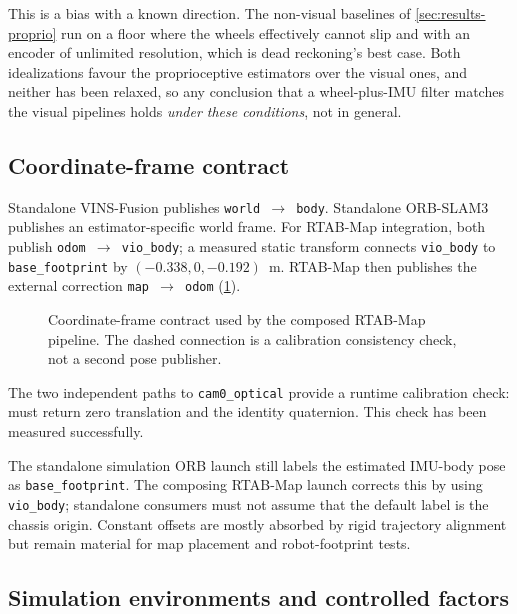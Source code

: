 \begin{queried}
This is a bias with a known direction. The non-visual baselines of
\cref{sec:results-proprio} run on a floor where the wheels effectively cannot
slip and with an encoder of unlimited resolution, which is dead reckoning's
best case. Both idealizations favour the proprioceptive estimators over the
visual ones, and neither has been relaxed, so any conclusion that a
wheel-plus-IMU filter matches the visual pipelines holds \emph{under these
conditions}, not in general.
\end{queried}

\subsection{Coordinate-frame contract}
\label{sec:frames-contract}
Standalone VINS-Fusion publishes \texttt{world~$\rightarrow$~body}. Standalone
ORB-SLAM3 publishes an estimator-specific world frame. For RTAB-Map integration,
both publish \texttt{odom~$\rightarrow$~vio\_body}; a measured static transform
connects \texttt{vio\_body} to \texttt{base\_footprint} by
$(-0.338,0,-0.192)$~m. RTAB-Map then publishes the external correction
\texttt{map~$\rightarrow$~odom} (\cref{fig:frame-chain}).

\begin{figure}[htbp]
  \centering
  \resizebox{\textwidth}{!}{}
  \caption[Coordinate-frame contract used by the composed RTAB-Map pipeline.]{Coordinate-frame contract used by the composed RTAB-Map pipeline. The
  dashed connection is a calibration consistency check, not a second pose
  publisher.}
  \label{fig:frame-chain}
\end{figure}

The two independent paths to \texttt{cam0\_optical} provide a runtime calibration
check:  must return zero translation and
the identity quaternion. This check has been measured successfully.

The standalone simulation ORB launch still labels the estimated IMU-body pose as
\texttt{base\_footprint}. The composing RTAB-Map launch corrects this by using
\texttt{vio\_body}; standalone consumers must not assume that the default label is
the chassis origin. Constant offsets are mostly absorbed by rigid trajectory
alignment but remain material for map placement and robot-footprint tests.


\subsection{Simulation environments and controlled factors}
\label{sec:environments-datasets}

